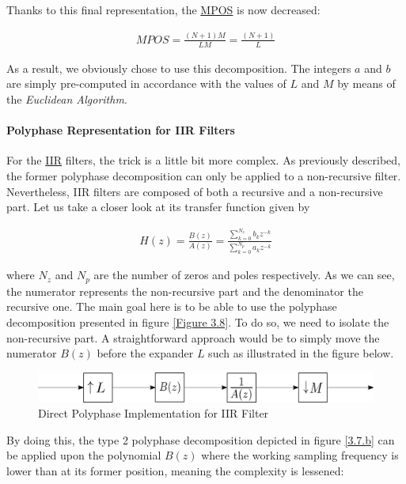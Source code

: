 Thanks to this final representation, the \hyperlink{MPOS}{MPOS} is now decreased:

\begin{align}
	MPOS =  \frac{(N+1)M}{LM} = \frac{(N+1)}{L}\label{eqn:final_poly}
\end{align}

As a result, we obviously chose to use this decomposition. The integers $a$ and $b$ are simply pre-computed in accordance with the values of $L$ and $M$ by means of the \textit{Euclidean Algorithm}.


\paragraph{Polyphase Representation for IIR Filters}

\justify

For the \hyperlink{IIR}{IIR} filters, the trick is a little bit more complex. As previously described, the former polyphase decomposition can only be applied to a non-recursive filter. Nevertheless, IIR filters are composed of both a recursive and a non-recursive part. Let us take a closer look at its transfer function given by 

\begin{align}
	H(z) = \frac{B(z)}{A(z)} =  \frac{\sum\limits_{k=0}^{N_z} b_kz^{-k} }{\sum\limits_{k=0}^{N_p} a_kz^{-k}}
	\label{eqn:3.14}
\end{align}

where $N_z$ and $N_p$ are the number of zeros and poles respectively. As we can see, the numerator represents the non-recursive part and the denominator the recursive one. The main goal here is to be able to use the polyphase decomposition presented in figure \ref{Figure 3.8}. To do so, we need to isolate the non-recursive part. A straightforward approach would be to simply move the numerator $B(z)$ before the expander $L$ such as illustrated in the figure below.

\begin{figure}[htb!]
	\centering
	\includegraphics[scale=0.8]{iir_direct_poly.png}
	\caption{Direct Polyphase Implementation for IIR Filter}
	\label{Figure 3.9}
\end{figure}

By doing this, the type 2 polyphase decomposition depicted in figure \ref{3.7.b} can be applied upon the polynomial $B(z)$ where the working sampling frequency is lower than at its former position, meaning the complexity is lessened:


